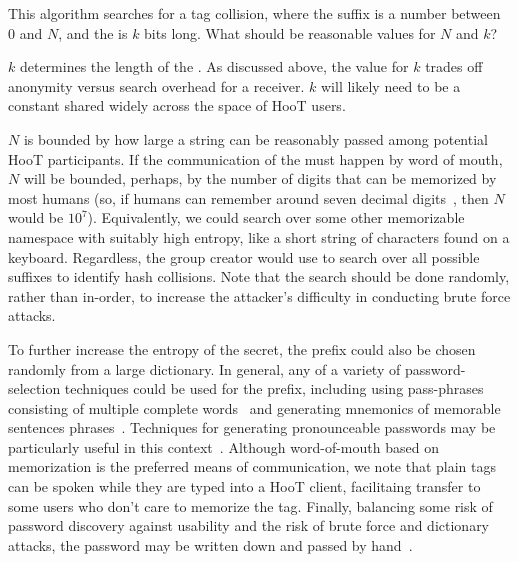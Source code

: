 %
This algorithm searches for a tag collision, where the  suffix is
a number between 0 and $N$, and the  is $k$ bits long.
What should be reasonable values for $N$ and $k$?

$k$ determines the length of the . As discussed above, the value for $k$
trades off anonymity versus search overhead for a receiver. $k$ will likely need to be
a constant shared widely across the space of HooT users.

$N$ is bounded by how large a  string can be reasonably
passed among potential HooT participants. If the communication of the
 must happen by word of mouth, $N$ will be bounded,
perhaps, by the number of digits that can be memorized by most humans
(so, if humans can remember around seven decimal
digits~\cite{miller56}, then $N$ would be $10^7$). Equivalently, we
could search over some other memorizable namespace with suitably high
entropy, like a short string of characters found on a keyboard.
Regardless, the group creator would use  to search over all possible suffixes to
identify hash collisions. Note that the search should be done
randomly, rather than in-order, to increase the attacker's difficulty
in conducting brute force attacks. 

To further increase the entropy of the secret, the prefix could also be
chosen randomly from a large dictionary. In general, any of a variety of
password-selection techniques could be used for the prefix, including
using pass-phrases consisting of multiple complete
words~\cite{passphrase} and generating mnemonics of memorable sentences
phrases~\cite{mnemonics}. Techniques for generating pronounceable
passwords may be particularly useful in this
context~\cite{gasser}. Although word-of-mouth based on memorization is
the preferred means of communication, we note that plain tags can be
spoken while they are typed into a HooT client, facilitaing transfer to
some users who don't care to memorize the tag. Finally, balancing some
risk of password discovery against usability and the risk of brute force
and dictionary attacks, the password may be written down and passed by
hand~\cite{written-passwords}.

